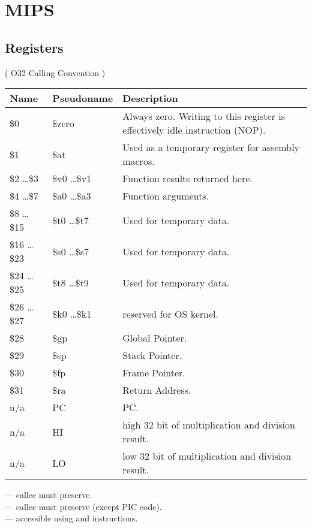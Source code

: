 \ifx\RUSSIAN\undefined
\chapter{MIPS}

\section{Registers}
\label{MIPS_registers_ref}

( O32 Calling Convention )

\begin{center}
\begin{tabular}{ | l | l | l | }
\hline
\cellcolor{blue!25} Name & \cellcolor{blue!25} Pseudoname & \cellcolor{blue!25} Description \\
\hline
\$0             & \$zero          & Always zero. Writing to this register is effectively idle instruction (\ac{NOP}). \\
\hline
\$1             & \$at            & Used as a temporary register for assembly macros. \\
\hline
\$2 \dots \$3   & \$v0 \dots \$v1 & Function results returned here. \\
\hline
\$4 \dots \$7   & \$a0 \dots \$a3 & Function arguments. \\
\hline
\$8 \dots \$15  & \$t0 \dots \$t7 & Used for temporary data. \\
\hline
\$16 \dots \$23 & \$s0 \dots \$s7 & Used for temporary data\AsteriskOne{}. \\
\hline
\$24 \dots \$25 & \$t8 \dots \$t9 & Used for temporary data. \\
\hline
\$26 \dots \$27 & \$k0 \dots \$k1 & reserved for OS kernel. \\
\hline
\$28            & \$gp            & Global Pointer\AsteriskTwo{}. \\
\hline
\$29            & \$sp            & Stack Pointer\AsteriskOne{}. \\
\hline
\$30            & \$fp            & Frame Pointer\AsteriskOne{}. \\
\hline
\$31            & \$ra            & Return Address. \\
\hline
n/a             & PC              & \ac{PC}. \\
\hline
n/a             & HI              & high 32 bit of multiplication and division result\AsteriskThree{}. \\
\hline
n/a             & LO              & low 32 bit of multiplication and division result\AsteriskThree{}. \\
\end{tabular}
\end{center}

\AsteriskOne{} --- \Gls{callee} must preserve.\\
\AsteriskTwo{} --- \Gls{callee} must preserve (except \ac{PIC} code).\\
\AsteriskThree{} --- accessible using  and  instructions.\\

\iffalse
FPU:
$f0..$f30
\fi

\fi
